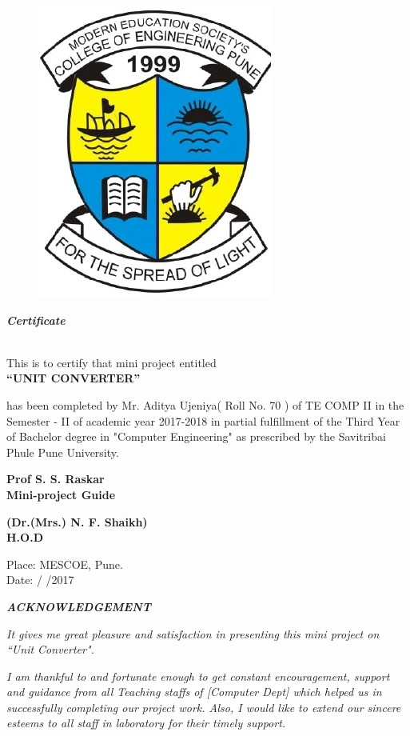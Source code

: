 \documentclass[a4paper, 12pt]{report}
\begin{document}
\begin{frontmatter}
\begin{titlepage}
\begin{center}
\begin{figure}[h]
\centering
\includegraphics[width=0.3\linewidth]{./logo}
\end{figure}
\begin{LARGE}
\textbf{\textit {Certificate}}\end{LARGE}\\[1.2cm]
This is to certify that mini project entitled\\[0.5cm]\large\textbf{\enquote{UNIT CONVERTER}}
\end{center}  
has been completed by Mr. Aditya Ujeniya( Roll No. 70 ) of TE COMP II in the Semester - II of academic year 2017-2018 in partial fulfillment of the Third Year of Bachelor degree in "Computer Engineering" as prescribed by the Savitribai Phule Pune University.
\vspace{3cm}
\begin{multicols}{2}
\begin{center}
\textbf{Prof S. S. Raskar\\Mini-project Guide}\hspace{5cm}\\
\end{center}
\begin{center}
\textbf{(Dr.(Mrs.) N. F. Shaikh)\\H.O.D}\\
\end{center}
\end{multicols}\vspace{0.6cm}
Place: MESCOE, Pune.\\
\hspace{0.5cm}Date:   /   /2017
\vfill

\end{titlepage}

\pagebreak

\newpage
\begin{center}
{\Large{\bf{\textit{ACKNOWLEDGEMENT}}\\[2cm]}}
\end{center}
\par \textit{It gives me great pleasure and satisfaction in presenting this mini project on “Unit Converter".} \\
\par \textit{I am thankful to and fortunate enough to get constant encouragement, support and guidance from all Teaching staffs of [Computer Dept] which helped us in successfully completing our project work. Also, I would like to extend our sincere esteems to all staff in laboratory for their timely support.} \\


\end{frontmatter}
\end{document}
